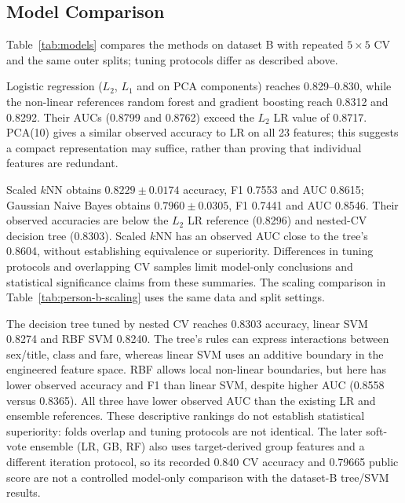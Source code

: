 \documentclass[10pt,twocolumn]{article}
\begin{document}
\subsection{Model Comparison}
Table~\ref{tab:models} compares the methods on dataset B with repeated $5\times5$ CV and the same outer splits; tuning protocols differ as described above.

Logistic regression ($L_2$, $L_1$ and on PCA components) reaches 0.829--0.830, while the non-linear references random forest and gradient boosting reach 0.8312 and 0.8292. Their AUCs (0.8799 and 0.8762) exceed the $L_2$ LR value of 0.8717. PCA(10) gives a similar observed accuracy to LR on all 23 features; this suggests a compact representation may suffice, rather than proving that individual features are redundant.

Scaled $k$NN obtains $0.8229\pm0.0174$ accuracy, F1 0.7553 and AUC 0.8615; Gaussian Naive Bayes obtains $0.7960\pm0.0305$, F1 0.7441 and AUC 0.8546.
Their observed accuracies are below the $L_2$ LR reference (0.8296) and nested-CV decision tree (0.8303).
Scaled $k$NN has an observed AUC close to the tree's 0.8604, without establishing equivalence or superiority.
Differences in tuning protocols and overlapping CV samples limit model-only conclusions and statistical significance claims from these summaries.
The scaling comparison in Table~\ref{tab:person-b-scaling} uses the same data and split settings.

The decision tree tuned by nested CV reaches 0.8303 accuracy, linear SVM 0.8274 and RBF SVM 0.8240. The tree's rules can express interactions between sex/title, class and fare, whereas linear SVM uses an additive boundary in the engineered feature space. RBF allows local non-linear boundaries, but here has lower observed accuracy and F1 than linear SVM, despite higher AUC (0.8558 versus 0.8365). All three have lower observed AUC than the existing LR and ensemble references. These descriptive rankings do not establish statistical superiority: folds overlap and tuning protocols are not identical. The later soft-vote ensemble (LR, GB, RF) also uses target-derived group features and a different iteration protocol, so its recorded 0.840 CV accuracy and 0.79665 public score are not a controlled model-only comparison with the dataset-B tree/SVM results.
\end{document}
